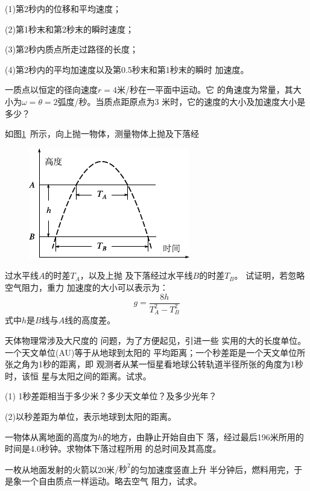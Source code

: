 \begin{exercises}
(1)第2秒内的位移和平均速度；

(2)第1秒末和第2秒末的瞬时速度；

(3)第2秒内质点所走过路径的长度；

(4)第2秒内的平均加速度以及第0.5秒末和第1秒末的瞬时
加速度。

\exercise 一质点以恒定的径向速度$r=4$米/秒在一平面中运动。它
的角速度为常量，其大小为$\omega=\dot\theta=2$弧度/秒。当质点距原点为3
米时，它的速度的大小及加速度大小是多少？

\exercise 如图\ref{fig:01.29}~所示，向上抛一物体，测量物体上抛及下落经
\begin{figure}
  \begin{center}
    \includegraphics{figure/fig01.29}
    \caption{}
    \label{fig:01.29}
  \end{center}
\end{figure}
过水平线$A$的时差$T_A$，以及上抛
及下落经过水平线$B$的时差$T_B$。
试证明，若忽略空气阻力，重力
加速度的大小可以表示为：
\begingroup
\setlength{\mathindent}{4em}
\begin{equation*}
    g=\dfrac{8h}{T_A^2 - T_B^2}
\end{equation*}
\endgroup
式中$h$是$B$线与$A$线的高度差。

\exercise 天体物理常涉及大尺度的
问题，为了方便起见，引进一些
实用的大的长度单位。一个天文单位(AU)等于从地球到太阳的
平均距离；一个秒差距是一个天文单位所张之角为1秒的距离，即
观测者从某一恒星看地球公转轨道半径所张的角度为1秒时，该恒
星与太阳之间的距离。试求。

(1) 1秒差距相当于多少米？多少天文单位？及多少光年？

(2)以秒差距为单位，表示地球到太阳的距离。

\exercise 一物体从离地面的高度为$ h $的地方，由静止开始自由下
落，经过最后196米所用的时间是4.0秒钟。求物体下落过程所用
的总时间及其高度。

\exercise 一枚从地面发射的火箭以20米/$\text{秒}^2$的匀加速度竖直上升
半分钟后，燃料用完，于是象一个自由质点一样运动。略去空气
阻力，试求。


\end{exercises}
